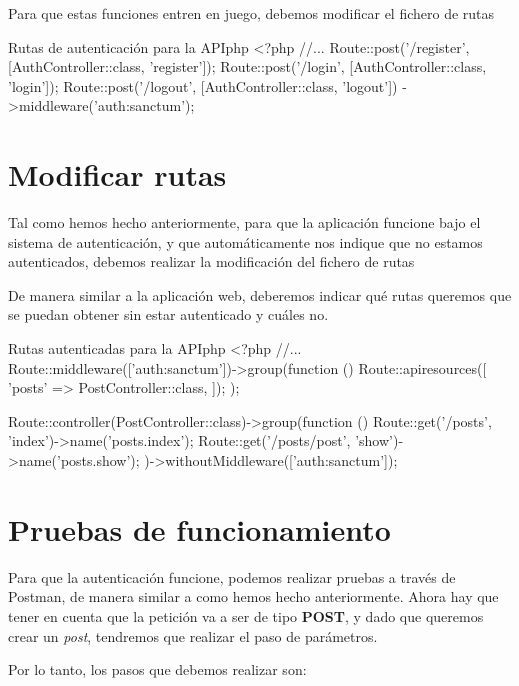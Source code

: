 Para que estas funciones entren en juego, debemos modificar el fichero de rutas 

\begin{mycode}{Rutas de autenticación para la API}{php}{}
<?php
//...
Route::post('/register', [AuthController::class, 'register']);
Route::post('/login', [AuthController::class, 'login']);
Route::post('/logout', [AuthController::class, 'logout'])
    ->middleware('auth:sanctum');
\end{mycode}




\section{Modificar rutas}

Tal como hemos hecho anteriormente, para que la aplicación funcione bajo el sistema de autenticación, y que automáticamente nos indique que no estamos autenticados, debemos realizar la modificación del fichero de rutas 


De manera similar a la aplicación web, deberemos indicar qué rutas queremos que se puedan obtener sin estar autenticado y cuáles no.


\begin{mycode}{Rutas autenticadas para la API}{php}{}
<?php
//...
Route::middleware(['auth:sanctum'])->group(function () {
    Route::apiresources([
        'posts' => PostController::class,
    ]);
});

Route::controller(PostController::class)->group(function () {
    Route::get('/posts', 'index')->name('posts.index');
    Route::get('/posts/{post}', 'show')->name('posts.show');
})->withoutMiddleware(['auth:sanctum']);
\end{mycode}

\section{Pruebas de funcionamiento}


Para que la autenticación funcione, podemos realizar pruebas a través de Postman, de manera similar a como hemos hecho anteriormente. Ahora hay que tener en cuenta que la petición va a ser de tipo \textbf{POST}, y dado que queremos crear un \textit{post}, tendremos que realizar el paso de parámetros.

Por lo tanto, los pasos que debemos realizar son:

